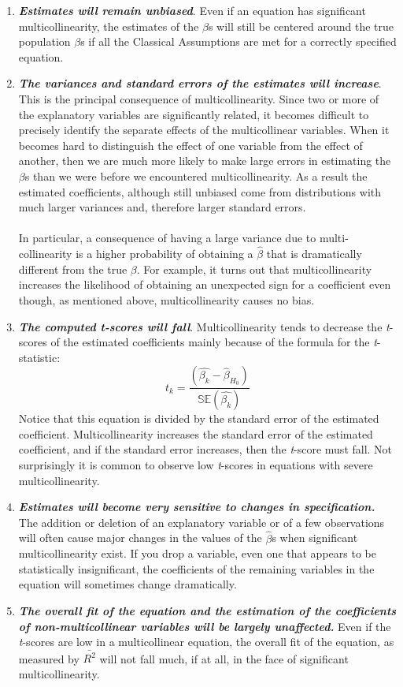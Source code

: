 \documentclass[11pt]{article}
\begin{document}
\begin{enumerate}
\item \textit{\textbf{Estimates will remain unbiased}}. Even if an equation has significant multicollinearity, the estimates of the $\beta$s will still be centered around the true population $\beta$s if all the Classical Assumptions are met for a correctly specified equation.
\item \textbf{\textit{The variances and standard errors of the estimates will increase}}. This is the principal consequence of multicollinearity. Since two or more of the explanatory variables are significantly related, it becomes difficult to precisely identify the separate effects of the multicollinear variables. When it becomes hard to distinguish the effect of one variable from the effect of another, then we are much more likely to make large errors in estimating the $\beta$s than we were before we encountered multicollinearity. As a result the estimated coefficients, although still unbiased come from distributions with much larger variances and, therefore larger standard errors.\\ \\
In particular, a consequence of having a large variance due to multi-collinearity is a higher probability of obtaining a $\hat{\beta}$ that is dramatically different from the true $\beta$. For example, it turns out that multicollinearity increases the likelihood of obtaining an unexpected sign for a coefficient even though, as mentioned above, multicollinearity causes no bias.
\item \textit{\textbf{The computed t-scores will fall}}. Multicollinearity tends to decrease the \textit{t}-scores of the estimated coefficients mainly because of the formula for the \textit{t}-statistic:
\begin{equation}
t_k = \frac{(\hat{\beta_k} - \hat{\beta}_{H_0})}{\mathbb{SE}(\hat{\beta_{k}})} \label{eg8_8}
\end{equation} 
Notice that this equation is divided by the standard error of the estimated coefficient. Multicollinearity increases the standard error of the estimated coefficient, and if the standard error increases, then the \textit{t}-score must fall. Not surprisingly it is common to observe low \textit{t}-scores in equations with severe multicollinearity.
\item \textbf{\textit{Estimates will become very sensitive to changes in specification.}} The addition or deletion of an explanatory variable or of a few observations will often cause major changes in the values of the $\hat{\beta}$s when significant multicollinearity exist. If you drop a variable, even one that appears to be statistically insignificant, the coefficients of the remaining variables in the equation will sometimes change dramatically. 
\item \textit{\textbf{The overall fit of the equation and the estimation of the coefficients of non-multicollinear variables will be largely unaffected.}} Even if the \textit{t}-scores are low in a multicollinear equation, the overall fit of the equation, as measured by $\bar{R^2}$ will not fall much, if at all, in the face of significant multicollinearity.
\end{enumerate}
\end{document}
